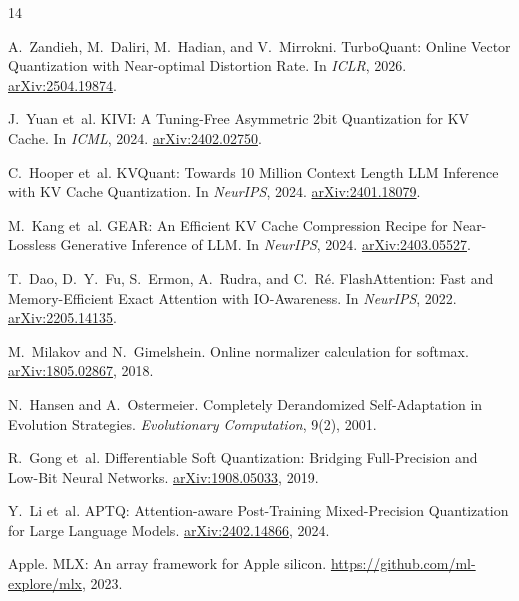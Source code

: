 \documentclass[11pt,a4paper]{article}
\begin{document}
\begin{thebibliography}{14}

A.~Zandieh, M.~Daliri, M.~Hadian, and V.~Mirrokni.
\newblock TurboQuant: Online Vector Quantization with Near-optimal Distortion Rate.
\newblock In \emph{ICLR}, 2026.
\newblock \href{https://arxiv.org/abs/2504.19874}{arXiv:2504.19874}.

J.~Yuan et~al.
\newblock KIVI: A Tuning-Free Asymmetric 2bit Quantization for KV Cache.
\newblock In \emph{ICML}, 2024.
\newblock \href{https://arxiv.org/abs/2402.02750}{arXiv:2402.02750}.

C.~Hooper et~al.
\newblock KVQuant: Towards 10 Million Context Length LLM Inference with KV Cache Quantization.
\newblock In \emph{NeurIPS}, 2024.
\newblock \href{https://arxiv.org/abs/2401.18079}{arXiv:2401.18079}.

M.~Kang et~al.
\newblock GEAR: An Efficient KV Cache Compression Recipe for Near-Lossless Generative Inference of LLM.
\newblock In \emph{NeurIPS}, 2024.
\newblock \href{https://arxiv.org/abs/2403.05527}{arXiv:2403.05527}.

T.~Dao, D.~Y.~Fu, S.~Ermon, A.~Rudra, and C.~R\'{e}.
\newblock FlashAttention: Fast and Memory-Efficient Exact Attention with IO-Awareness.
\newblock In \emph{NeurIPS}, 2022.
\newblock \href{https://arxiv.org/abs/2205.14135}{arXiv:2205.14135}.

M.~Milakov and N.~Gimelshein.
\newblock Online normalizer calculation for softmax.
\newblock \href{https://arxiv.org/abs/1805.02867}{arXiv:1805.02867}, 2018.

N.~Hansen and A.~Ostermeier.
\newblock Completely Derandomized Self-Adaptation in Evolution Strategies.
\newblock \emph{Evolutionary Computation}, 9(2), 2001.

R.~Gong et~al.
\newblock Differentiable Soft Quantization: Bridging Full-Precision and Low-Bit Neural Networks.
\newblock \href{https://arxiv.org/abs/1908.05033}{arXiv:1908.05033}, 2019.

Y.~Li et~al.
\newblock APTQ: Attention-aware Post-Training Mixed-Precision Quantization for Large Language Models.
\newblock \href{https://arxiv.org/abs/2402.14866}{arXiv:2402.14866}, 2024.

Apple.
\newblock MLX: An array framework for Apple silicon.
\newblock \url{https://github.com/ml-explore/mlx}, 2023.


\end{thebibliography}
\end{document}
